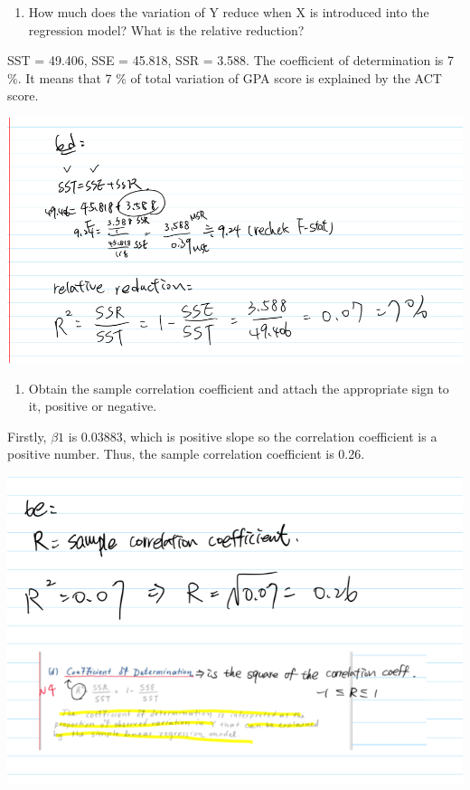 \documentclass[
]{article}
\providecommand{\tightlist}{%
  \setlength{\itemsep}{0pt}\setlength{\parskip}{0pt}}
\begin{document}
\begin{enumerate}
\def\labelenumi{(\alph{enumi})}
\setcounter{enumi}{3}
\tightlist
\item
  How much does the variation of Y reduce when X is introduced into the
  regression model? What is the relative reduction?
\end{enumerate}

SST = 49.406, SSE = 45.818, SSR = 3.588. The coefficient of
determination is 7 \%. It means that 7 \% of total variation of GPA
score is explained by the ACT score.

\includegraphics{pics/Screen Shot 2021-02-19 at 1.51.21 PM.png}

\begin{enumerate}
\def\labelenumi{(\alph{enumi})}
\setcounter{enumi}{4}
\tightlist
\item
  Obtain the sample correlation coefficient and attach the appropriate
  sign to it, positive or negative.
\end{enumerate}

Firstly, \(\beta1\) is 0.03883, which is positive slope so the
correlation coefficient is a positive number. Thus, the sample
correlation coefficient is 0.26.

\includegraphics{pics/Screen Shot 2021-02-19 at 1.59.41 PM.png}
\end{document}
